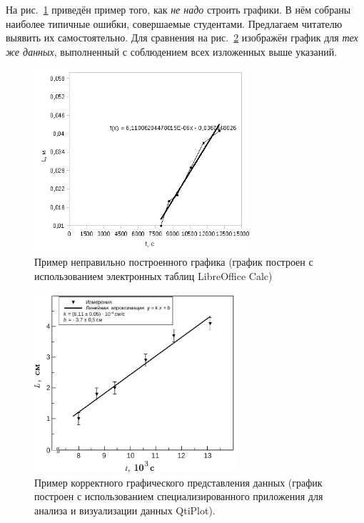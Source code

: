 На рис.~\ref{fig:incorrect} приведён пример того, как \emph{не надо}
строить графики. В нём собраны наиболее типичные ошибки, совершаемые
студентами. Предлагаем читателю выявить их самостоятельно. Для сравнения
на рис.~\ref{fig:correct} изображён график для \emph{тех же данных},
выполненный с соблюдением всех изложенных выше указаний.
\begin{figure}[ht]
\begin{centering}
\includegraphics[width=8cm]{images/bad.png}
\par\end{centering}
\caption{\label{fig:incorrect}Пример неправильно построенного графика (график
построен с использованием электронных таблиц LibreOffice Calc)}
\end{figure}
\begin{figure}[h!]
\begin{centering}
\includegraphics[width=7.5cm]{images/good.pdf}
\par\end{centering}
\caption{\label{fig:correct}Пример корректного графического представления
данных (график построен с использованием специализированного приложения
для анализа и визуализации данных QtiPlot).}
\end{figure}


